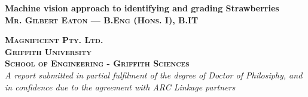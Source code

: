 \documentclass[fleqn,twoside]{article}
\begin{document}
\raggedbottom

\begin{titlepage}


\newcommand{\HRule}{\rule{\linewidth}{0.5mm}} %
 
\begin{flushleft} 
 



{ \Huge \bfseries Machine vision approach to identifying and grading Strawberries}\\[1.5cm] %


\textsc{\Large \bfseries Mr. Gilbert Eaton --- B.Eng (Hons. I), B.IT}\\[0.5cm] %
 
 
 
\vspace{10mm} 



\textsc{\Large \bfseries Magnificent Pty. Ltd.}\\[0.5cm] %
\textsc{\Large \bfseries Griffith University}\\[0.5cm] %
\textsc{\Large \bfseries School of Engineering - Griffith Sciences}\\[1.5cm] %


\emph{A report submitted in partial fulfilment of the degree of Doctor of Philosiphy, and in confidence due to the agreement with ARC Linkage partners}\\[1.5cm]




\end{flushleft}

\vfill %

\end{titlepage}
\end{document}
